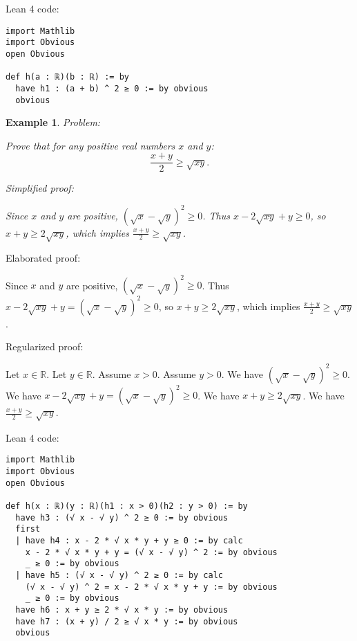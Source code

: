 \documentclass{article}
\newtheorem{example}{Example}
\begin{document}
Lean 4 code:
\begin{tcolorbox}[colback=white!10, width=\linewidth]
\begin{lstlisting}[language=Lean4]
import Mathlib
import Obvious
open Obvious

def h(a : ℝ)(b : ℝ) := by
  have h1 : (a + b) ^ 2 ≥ 0 := by obvious
  obvious

\end{lstlisting}
\end{tcolorbox}


\begin{example}
Problem:
\begin{tcolorbox}[colback=yellow!10, width=\linewidth]
Prove that for any positive real numbers $x$ and $y$:
    $$\frac{x+y}{2} \geq \sqrt{xy}.$$
\end{tcolorbox}

Simplified proof:
\begin{tcolorbox}[colback=blue!10, width=\linewidth]
Since $x$ and $y$ are positive, $(\sqrt{x} - \sqrt{y})^2 \ge 0$. Thus $x - 2\sqrt{xy} + y \ge 0$, so $x+y \ge 2\sqrt{xy}$, which implies $\frac{x+y}{2} \ge \sqrt{xy}$.
\end{tcolorbox}
\end{example}

Elaborated proof:
\begin{tcolorbox}[colback=green!10, width=\linewidth]
Since $x$ and $y$ are positive, $(\sqrt{x} - \sqrt{y})^2 \ge 0$. Thus $x - 2\sqrt{xy} + y = (\sqrt{x} - \sqrt{y})^2 \ge 0$, so $x+y \ge 2\sqrt{xy}$, which implies $\frac{x+y}{2} \ge \sqrt{xy}$.
\end{tcolorbox}

Regularized proof:
\begin{tcolorbox}[colback=red!10, width=\linewidth]
Let $x\in\mathbb{R}$.
Let $y\in\mathbb{R}$.
Assume $x > 0$.
Assume $y > 0$.
We have ${(\sqrt{x} - \sqrt{y})}^2 \ge 0$.
We have $x - 2\sqrt{xy} + y = {(\sqrt{x} - \sqrt{y})}^2 \ge 0$.
We have $x+y \ge 2\sqrt{xy}$.
We have $\frac{x+y}{2} \ge \sqrt{xy}$.
\end{tcolorbox}

Lean 4 code:
\begin{tcolorbox}[colback=white!10, width=\linewidth]
\begin{lstlisting}[language=Lean4]
import Mathlib
import Obvious
open Obvious

def h(x : ℝ)(y : ℝ)(h1 : x > 0)(h2 : y > 0) := by
  have h3 : (√ x - √ y) ^ 2 ≥ 0 := by obvious
  first
  | have h4 : x - 2 * √ x * y + y ≥ 0 := by calc
    x - 2 * √ x * y + y = (√ x - √ y) ^ 2 := by obvious
    _ ≥ 0 := by obvious
  | have h5 : (√ x - √ y) ^ 2 ≥ 0 := by calc
    (√ x - √ y) ^ 2 = x - 2 * √ x * y + y := by obvious
    _ ≥ 0 := by obvious
  have h6 : x + y ≥ 2 * √ x * y := by obvious
  have h7 : (x + y) / 2 ≥ √ x * y := by obvious
  obvious

\end{lstlisting}
\end{tcolorbox}
\end{document}
